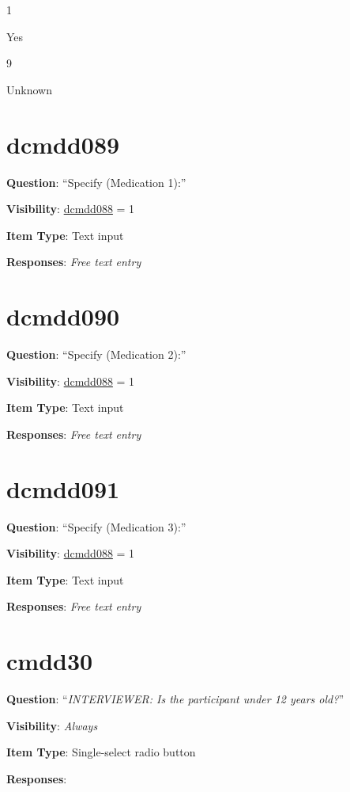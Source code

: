 \documentclass[
]{book}
\begin{document}
1

Yes

9

Unknown

\hypertarget{dcmdd089}{%
\section{dcmdd089}\label{dcmdd089}}

\textbf{Question}: ``Specify (Medication 1):''

\textbf{Visibility}: \protect\hyperlink{dcmdd088}{dcmdd088} = 1

\textbf{Item Type}: Text input

\textbf{Responses}: \emph{Free text entry}

\hypertarget{dcmdd090}{%
\section{dcmdd090}\label{dcmdd090}}

\textbf{Question}: ``Specify (Medication 2):''

\textbf{Visibility}: \protect\hyperlink{dcmdd088}{dcmdd088} = 1

\textbf{Item Type}: Text input

\textbf{Responses}: \emph{Free text entry}

\hypertarget{dcmdd091}{%
\section{dcmdd091}\label{dcmdd091}}

\textbf{Question}: ``Specify (Medication 3):''

\textbf{Visibility}: \protect\hyperlink{dcmdd088}{dcmdd088} = 1

\textbf{Item Type}: Text input

\textbf{Responses}: \emph{Free text entry}

\hypertarget{cmdd30}{%
\section{cmdd30}\label{cmdd30}}

\textbf{Question}: ``\emph{INTERVIEWER: Is the participant under 12 years old?}''

\textbf{Visibility}: \emph{Always}

\textbf{Item Type}: Single-select radio button

\textbf{Responses}:
\end{document}
